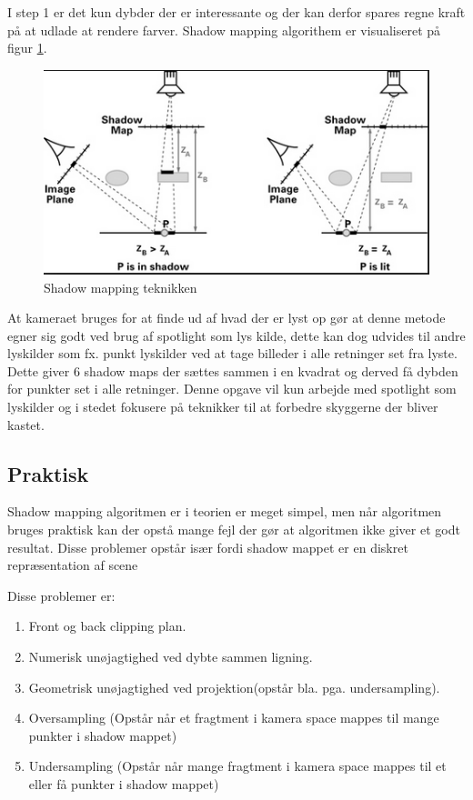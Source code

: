 \documentclass[11pt,a4paper]{article}
\begin{document}
I step 1 er det kun dybder der er interessante og der kan derfor spares regne kraft på at udlade at rendere farver. Shadow mapping algorithem er visualiseret på figur \ref{shadowmapdesc}.


\begin{figure}[ht!]
\centering
\includegraphics[width=140mm]{img/2.png}
\caption{Shadow mapping teknikken}
\label{shadowmapdesc}
\end{figure}


At kameraet bruges for at finde ud af hvad der er lyst op gør at denne metode egner sig godt ved brug af spotlight som lys kilde, dette kan dog udvides til andre lyskilder som fx. punkt lyskilder ved at tage billeder i alle retninger set fra lyste. Dette giver 6 shadow maps der sættes sammen i en kvadrat og derved få dybden for punkter set i alle retninger. Denne opgave vil kun arbejde med spotlight som lyskilder og i stedet fokusere på teknikker til at forbedre skyggerne der bliver kastet.  


\subsection{Praktisk}


Shadow mapping algoritmen er i teorien er meget simpel, men når algoritmen bruges praktisk kan der opstå mange fejl der gør at algoritmen ikke giver et godt resultat. Disse problemer opstår især fordi shadow mappet er en diskret repræsentation af scene 

Disse problemer er:
\begin{enumerate}
\item Front og back clipping plan.
\item Numerisk unøjagtighed ved dybte sammen ligning.
\item Geometrisk unøjagtighed ved projektion(opstår bla. pga. undersampling).
\item Oversampling (Opstår når et fragtment i kamera space mappes til mange punkter i shadow mappet)
\item Undersampling (Opstår når mange fragtment i kamera space mappes til et eller få punkter i shadow mappet)
\end{enumerate}
\end{document}

